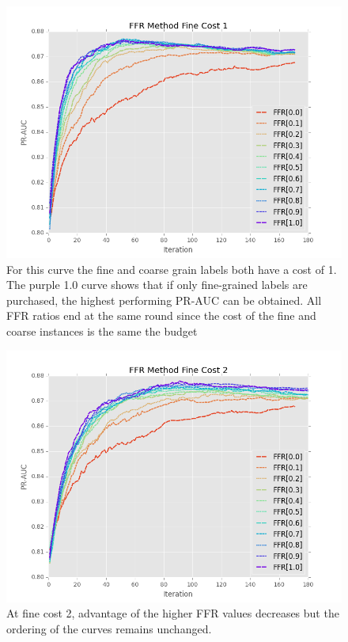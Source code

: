 \documentclass[ms]{nuthesis}
\begin{document}
\FloatBarrier
\begin{figure}[!htb]
	\centering
    \includegraphics[width=1.0\columnwidth]{fig/ParamsFFR_PR_Cost1_rnds0_180}
    \caption{For this curve the fine and coarse grain labels
    both have a cost of 1. The purple 1.0 curve shows that if only fine-grained labels
    are purchased, the highest performing PR-AUC can be obtained. All FFR ratios end at the same round
    since the cost of the fine and coarse instances is the same the budget}
    \label{fig:ParamsFFR_PR_Cost1_rnds0_180}
\end{figure}
\FloatBarrier


\FloatBarrier
\begin{figure}[!htb]
	\centering
    \includegraphics[width=1.0\columnwidth]{fig/ParamsFFR_PR_Cost2_rnds0_180}
    \caption{At fine cost 2, advantage of the higher FFR values decreases but the ordering
    of the curves remains unchanged.}
    \label{fig:ParamsFFR_PR_Cost2_rnds0_180}
\end{figure}
\FloatBarrier
\end{document}
